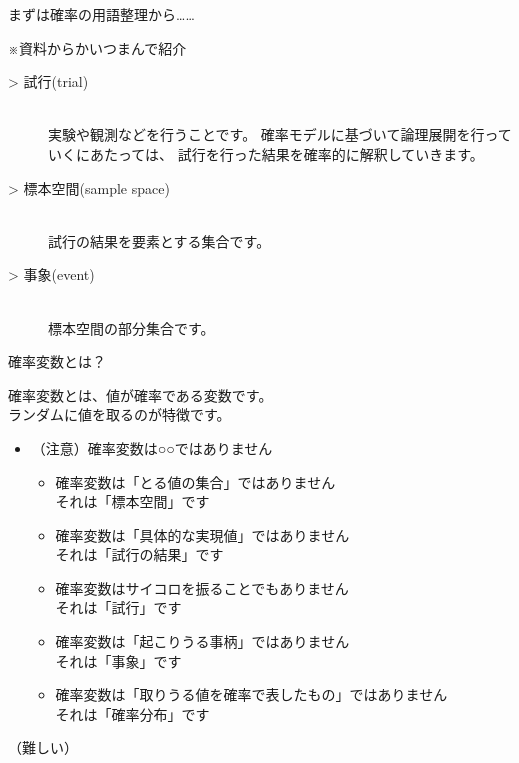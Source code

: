 \documentclass[dvipdfmx,cjk]{beamer}
\begin{document}
\begin{frame}{まずは確率の用語整理から……}

※資料からかいつまんで紹介\pause

\vskip 1cm

\begin{description}

    \item[> 試行(trial)]\mbox{}\\
            実験や観測などを行うことです。
            確率モデルに基づいて論理展開を行っていくにあたっては、
            試行を行った結果を確率的に解釈していきます。\pause

    \item[> 標本空間(sample space)]\mbox{}\\
            試行の結果を要素とする集合です。\pause

    \item[> 事象(event)]\mbox{}\\
            標本空間の部分集合です。

\end{description}

\end{frame}


\begin{frame}{確率変数とは？}\pause

確率変数とは、値が確率である変数です。\\
ランダムに値を取るのが特徴です。\pause

\vskip 1cm

\begin{itemize}

    \item （注意）確率変数は○○ではありません \pause
        \begin{itemize}
        \item 確率変数は「とる値の集合」ではありません\\ \pause
                それは「標本空間」です \pause
        \item 確率変数は「具体的な実現値」ではありません\\ \pause
                それは「試行の結果」です \pause
        \item 確率変数はサイコロを振ることでもありません\\ \pause
                それは「試行」です \pause
        \item 確率変数は「起こりうる事柄」ではありません\\ \pause
                それは「事象」です \pause
        \item 確率変数は「取りうる値を確率で表したもの」ではありません\\ \pause
                それは「確率分布」です \pause
        \end{itemize}
\end{itemize}

\vskip 1cm

（難しい）

\end{frame}
\end{document}
